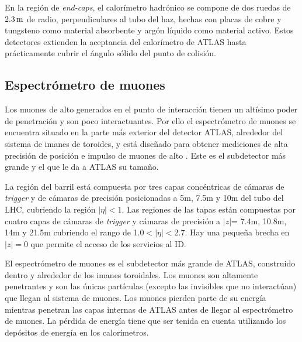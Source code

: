 En la región de \emph{end-caps}, el calorímetro hadrónico se compone de dos ruedas de
$\unit[2.3]{m}$ de radio, perpendiculares al tubo del haz, hechas con placas de cobre y
tungsteno como material absorbente y argón líquido como material activo. Estos
detectores extienden la aceptancia del calorímetro de ATLAS hasta prácticamente
cubrir el ángulo sólido del punto de colisión.


\subsection{Espectrómetro de muones}
\label{sec:espectrometro_muones}

Los muones de alto {\pt} generados en el punto de interacción tienen un altísimo
poder de penetración y son poco interactuantes. Por ello el espectrómetro de
muones \cite{muonTDR} se encuentra situado en la parte más exterior del detector
ATLAS, alrededor del sistema de imanes de toroides, y está diseñado para obtener
mediciones de alta precisión de posición e impulso de muones de alto \pt.
Este es el subdetector más grande y el que le da a ATLAS su tamaño.



La región del barril está compuesta por tres capas concéntricas de cámaras de
\emph{trigger} y de cámaras de precisión posicionadas a 5m, 7.5m y 10m del tubo del
LHC, cubriendo la región $|\eta|<1$. Las regiones de las tapas están compuestas
por cuatro capas de cámaras de \emph{trigger} y cámaras de precisión a $|z|$= 7.4m,
10.8m, 14m y 21.5m cubriendo el rango de 1.0$<|\eta|<$2.7. Hay una pequeña
brecha en $|z|=0$ que permite el acceso de los servicios al ID.

El espectrómetro de muones es el subdetector más grande de ATLAS, construido
dentro y alrededor de los imanes toroidales. Los muones son altamente penetrantes
y son las únicas partículas (excepto las invisibles que no interactúan) que llegan
al sistema de muones. Los muones pierden parte de su energía mientras penetran
las capas internas de ATLAS antes de llegar al espectrómetro de muones. La pérdida
de energía tiene que ser tenida en cuenta utilizando los depósitos de energía
en los calorímetros.

